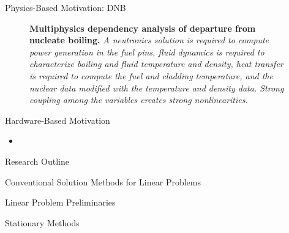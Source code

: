 \documentclass{beamer}
\begin{document}
\begin{frame}{Physics-Based Motivation: DNB}
  \begin{figure}[htpb!]
    \begin{center}
      \scalebox{1}{  }
    \end{center}
    \caption{\textbf{Multiphysics dependency analysis of departure from
        nucleate boiling.} \textit{A neutronics solution is required to
        compute power generation in the fuel pins, fluid dynamics is
        required to characterize boiling and fluid temperature and
        density, heat transfer is required to compute the fuel and
        cladding temperature, and the nuclear data modified with the
        temperature and density data. Strong coupling among the
        variables creates strong nonlinearities.}}
    \label{fig:dnb_example}
  \end{figure}
\end{frame}

\begin{frame}{Hardware-Based Motivation}
  \begin{itemize}
    \item
  \end{itemize}
\end{frame}

\begin{frame}{Research Outline}

\end{frame}

\begin{frame}{Conventional Solution Methods for Linear Problems}

\end{frame}

\begin{frame}{Linear Problem Preliminaries}

\end{frame}

\begin{frame}{Stationary Methods}

\end{frame}
\end{document}

